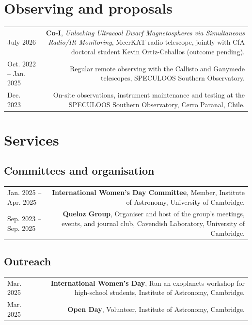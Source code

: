 \documentclass{article}
\begin{document}
\section*{Observing and proposals}
\begin{tabular}{L!{\vrule}R}
  July 2026 & \textbf{Co-I}, \textit{Unlocking Ultracool Dwarf Magnetospheres via Simultaneous Radio/IR Monitoring}, MeerKAT radio telescope, jointly with CfA doctoral student Kevin Ortiz-Ceballos (outcome pending). \\ 
  Oct. 2022 -- Jan. 2025 & Regular remote observing with the Callisto and Ganymede telescopes, SPECULOOS Southern Observatory. \\ %
  Dec. 2023 & On-site observations, instrument maintenance and testing at the SPECULOOS Southern Observatory, Cerro Paranal, Chile. \\
\end{tabular}

\section*{Services}
\subsection*{Committees and organisation}
\begin{tabular}{L!{\vrule}R}
  Jan. 2025 -- Apr. 2025 & \textbf{International Women's Day Committee}, Member, Institute of Astronomy, University of Cambridge. \\
  Sep. 2023 -- Sep. 2025 & \textbf{Queloz Group}, Organiser and host of the group's meetings, events, and journal club, Cavendish Laboratory, University of Cambridge. \\
\end{tabular}

\subsection*{Outreach}
\begin{tabular}{L!{\vrule}R}
  Mar. 2025 & \textbf{International Women's Day}, Ran an exoplanets workshop for high-school students, Institute of Astronomy, Cambridge.\\
  Mar. 2025 & \textbf{Open Day}, Volunteer, Institute of Astronomy, Cambridge.\\
\end{tabular}
\end{document}
